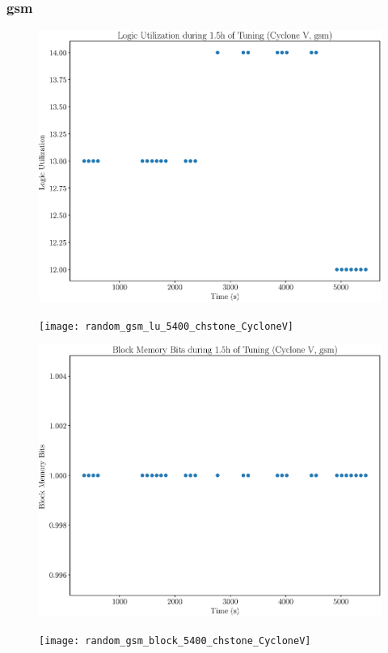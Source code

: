 \documentclass[12pt, a4paper]{article}
\begin{document}
\newpage

\subsubsection{gsm}

\begin{figure}[htpb]
    \centering
    \noindent
    \begin{minipage}{.48\textwidth}
        \centering
        \includegraphics[scale=.25]{gsm_lu_5400_chstone_CycloneV}
    \end{minipage}%
    \hfill
    \begin{minipage}{.48\textwidth}
        \centering
        \texttt{[image: random\_gsm\_lu\_5400\_chstone\_CycloneV]}
    \end{minipage}%

    \begin{minipage}{.48\textwidth}
        \includegraphics[scale=.25]{gsm_block_5400_chstone_CycloneV}
    \end{minipage}%
    \hfill
    \begin{minipage}{.48\textwidth}
        \texttt{[image: random\_gsm\_block\_5400\_chstone\_CycloneV]}
    \end{minipage}%


\end{figure}
\end{document}
